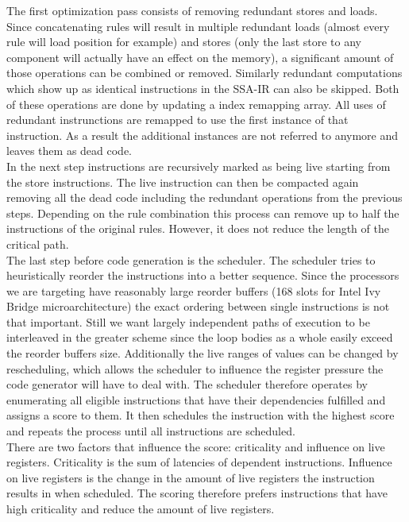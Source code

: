 The first optimization pass consists of removing redundant stores and loads. Since concatenating rules will result in multiple redundant loads (almost every rule will load position for example) and stores (only the last store to any component will actually have an effect on the memory), a significant amount of those operations can be combined or removed. Similarly redundant computations which show up as identical instructions in the SSA-IR can also be skipped. Both of these operations are done by updating a index remapping array. All uses of redundant instrunctions are remapped to use the first instance of that instruction. As a result the additional instances are not referred to anymore and leaves them as dead code.\\
In the next step instructions are recursively marked as being live starting from the store instructions. The live instruction can then be compacted again removing all the dead code including the redundant operations from the previous steps. Depending on the rule combination this process can remove up to half the instructions of the original rules. However, it does not reduce the length of the critical path.\\
The last step before code generation is the scheduler. The scheduler tries to heuristically reorder the instructions into a better sequence. Since the processors we are targeting have reasonably large reorder buffers (168 slots for Intel Ivy Bridge microarchitecture) the exact ordering between single instructions is not that important. Still we want largely independent paths of execution to be interleaved in the greater scheme since the loop bodies as a whole easily exceed the reorder buffers size. Additionally the live ranges of values can be changed by rescheduling, which allows the scheduler to influence the register pressure the code generator will have to deal with.
The scheduler therefore operates by enumerating all eligible instructions that have their dependencies fulfilled and assigns a score to them. It then schedules the instruction with the highest score and repeats the process until all instructions are scheduled. \\
There are two factors that influence the score: criticality and influence on live registers. Criticality is the sum of latencies of dependent instructions. Influence on live registers is the change in the amount of live registers the instruction results in when scheduled. The scoring therefore prefers instructions that have high criticality and reduce the amount of live registers.

